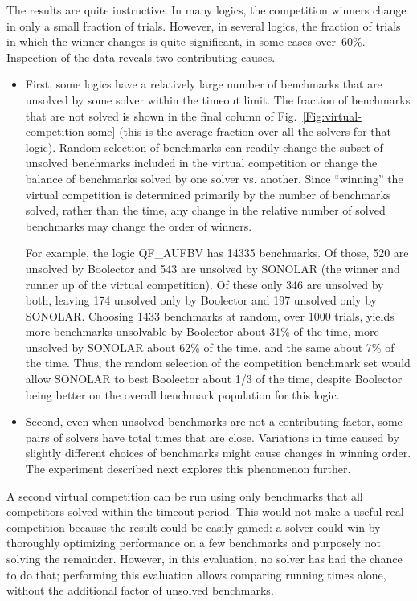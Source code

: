 \documentclass[smallcondensed]{svjour3}
\begin{document}
The results are quite instructive. In many logics, the competition winners change in only a small fraction of trials.
However, in several logics, the fraction of trials in which the winner changes is quite significant, in some cases over~60\%. Inspection of the data reveals two contributing causes.
\begin{itemize}
\item First, some logics have a relatively large number of benchmarks that are unsolved by some solver within the timeout limit.  The fraction of benchmarks that are not solved is shown in the final column of Fig.~\ref{Fig:virtual-competition-some} (this is the average fraction over all the solvers for that logic). Random selection of benchmarks can readily change the subset of unsolved benchmarks included in the virtual competition or change the balance of benchmarks solved by one solver vs. another. Since ``winning'' the virtual competition is determined primarily by the number of benchmarks solved, rather than the time, any change in the relative number of solved benchmarks may change the order of winners. 

For example, the logic QF\_AUFBV has 14335 benchmarks. Of those, 520 are unsolved by Boolector and 543 are unsolved by SONOLAR (the winner and runner up of the virtual competition). Of these only 346 are unsolved by both, leaving 174 unsolved only by Boolector and 197 unsolved only by SONOLAR. Choosing 1433 benchmarks at random, over 1000 trials, yields more benchmarks unsolvable by Boolector about 31\% of the time, more unsolved by SONOLAR about 62\% of the time, and the same about 7\% of the time. Thus, the random selection of the competition benchmark set would allow SONOLAR to best Boolector about 1/3 of the time, despite Boolector being better on the overall benchmark population for this logic.

\item Second, even when unsolved benchmarks are not a contributing factor, some pairs of solvers have total times that are close. Variations in time caused by slightly different choices of benchmarks might cause changes in winning order. The experiment described next explores this phenomenon further.

\end{itemize}

A second virtual competition can be run using only benchmarks that all competitors solved within the timeout period. This would not make a useful real competition because the result could be easily gamed: a solver could win by thoroughly optimizing performance on a few benchmarks and purposely not solving the remainder. However, in this evaluation, no solver has had the chance to do that; performing this evaluation allows comparing running times alone, without the additional factor of unsolved benchmarks.
\end{document}
